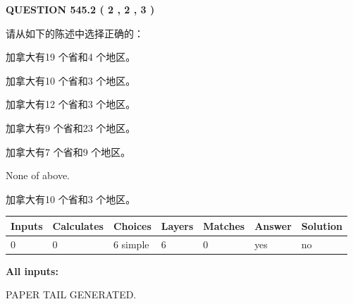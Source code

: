 \documentclass{ctexart}
\begin{document}
   
  
\vspace{0.2in}
  
{\textbf{\Large{QUESTION
545.2 
 ( 2 , 2 , 3 )
}}}
  
  
请从如下的陈述中选择正确的：
 
 
加拿大有19 个省和4 个地区。
 
 
加拿大有10 个省和3 个地区。
 
 
加拿大有12 个省和3 个地区。
 
 
加拿大有9 个省和23 个地区。
 
 
加拿大有7 个省和9 个地区。
 
 
 None of above.
 
 
\noindent{}
 
 
加拿大有10 个省和3 个地区。
 
 
\noindent{}
 
 
   
   
   
   
\noindent\begin{tabular}{|l|l|l|l|l|l|l|}
 \hline
Inputs & Calculates & Choices & Layers & Matches & Answer & Solution \\ \hline
 0  & 
 0  & 
 6
  simple  
  & 
 6  & 
 0  & 
  yes & 
  no 
  \\ \hline
 \end{tabular}
   
   
   
   
\noindent{}
   
   
   
   
\noindent\vspace{0.1in}\hspace{-0.08in} {\textbf{\Large{All inputs: }}}
   
   
   
   
   
   
 \vspace{0.2in}
 
   
   
\vspace{2.0in} PAPER TAIL GENERATED.
   
\end{document}
